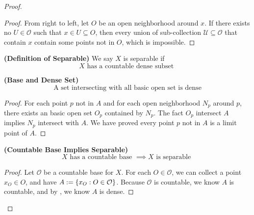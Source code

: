 \documentclass{report}
\begin{document}
\begin{proof}
\begin{proof}
  From right to left, let $O$ be an open neighborhood around $x$. If there exists no $U\in \mathcal{O}$ such that $x\in U\subseteq O$, then every union of sub-collection $\mathcal{U}\subseteq\mathcal{O}$ that contain $x$ contain some points not in  $O$, which is impossible.  
\end{proof}
\begin{definition}
\label{2.6.3}
\textbf{(Definition of Separable)} We say $X$ is separable if 
\begin{equation}
  X\text{ has a countable dense subset }
\end{equation}
\end{definition}
\begin{theorem}
\label{2.6.4}
\textbf{(Base and Dense Set)} 
\begin{equation}
\text{ A set intersecting with all basic open set is dense }
\end{equation}
\end{theorem}
\begin{proof}
For each point $p$ not in $A$ and for each open neighborhood $N_p$ around $p$, there exists an basic open set  $O_p$ contained by $N_p$. The fact  $O_p$ intersect $A$ implies  $N_p$ intersect with  $A$. We have proved every point  $p$ not in $A $ is a limit point of $A$.
\end{proof}
\begin{corollary}
\label{2.6.5}
\textbf{(Countable Base Implies Separable)} 
\begin{equation}
X\text{ has a countable base }\implies X\text{ is separable }
\end{equation}
\end{corollary}
\begin{proof}
Let $\mathcal{O}$ be a countable base for $X$. For each $O\in \mathcal{O}$, we can collect a point $x_O\in O$, and have $A:=\{ x_O:O\in \mathcal{O} \}$. Because $\mathcal{O}$ is countable, we know $A$ is countable, and by  , we know $A$ is dense.
\end{proof}
\end{proof}
\end{document}
